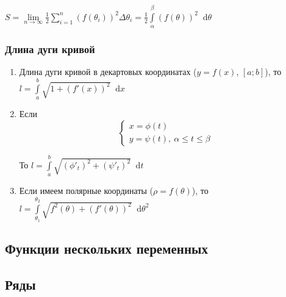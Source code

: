 \documentclass{article}
\newcommand*\diff{\mathop{}\!\mathrm{d}}
\begin{document}
$S = \lim\limits_{n \to \infty} \frac{1}{2} \sum\limits_{i = 1}^{n} (f(\theta_i))^2 \Delta \theta_i = \frac{1}{2} \int\limits_{\alpha}^{\beta} (f(\theta))^2 \diff \theta$

\subsubsection{Длина дуги кривой}

\begin{enumerate}
    \item Длина дуги кривой в декартовых координатах ($y = f(x)$, $[a; b]$), то $l = \int\limits_{a}^{b} \sqrt{1 + (f'(x))^2} \diff x$
    \item Если $$\begin{cases}
        x = \phi(t) \\
        y = \psi(t), \ \alpha \le t \le \beta
    \end{cases}$$

    То $l = \int\limits_{a}^{b} \sqrt{(\phi'_t)^2 + (\psi'_t)^2} \diff t$
    \item Если имеем полярные координаты ($\rho = f(\theta)$), то $l = \int\limits_{\theta_1}^{\theta_2} \sqrt{f^2(\theta) + (f'(\theta))^2} \diff \theta^2$
\end{enumerate}

\pagebreak
\subsection{Функции нескольких переменных}

\pagebreak
\subsection{Ряды}
\end{document}
